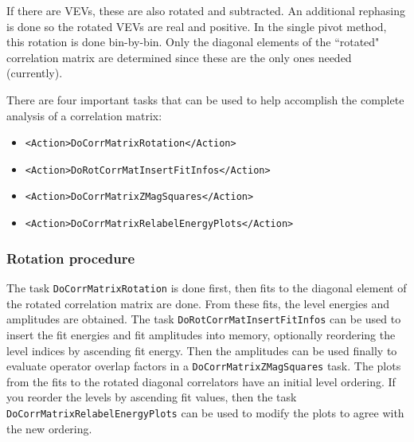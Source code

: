 \documentclass[12pt]{article}
\newcommand{\vb}{\texttt}
\begin{document}
   If there are VEVs, these are also rotated and subtracted.  An                 
   additional rephasing is done so the rotated VEVs are real and positive.       
   In the single pivot method, this rotation is done bin-by-bin.                 
   Only the diagonal elements of the ``rotated" correlation matrix are            
   determined since these are the only ones needed (currently).                  

There are four important tasks that can be used to help accomplish the complete
analysis of a correlation matrix:
\begin{itemize}
\item
\vb{<Action>DoCorrMatrixRotation</Action>}
\item                                              
\vb{<Action>DoRotCorrMatInsertFitInfos</Action>}        
\item                                              
\vb{<Action>DoCorrMatrixZMagSquares</Action>}   
\item                                              
\vb{<Action>DoCorrMatrixRelabelEnergyPlots</Action>}
\end{itemize}

\subsubsection{Rotation procedure}

The task \vb{DoCorrMatrixRotation} is done first, then fits to the diagonal     
element of the rotated correlation matrix are done.  From these fits,        
the level energies and amplitudes are obtained.  The task                    
\vb{DoRotCorrMatInsertFitInfos} can be used to insert the fit energies and  
fit amplitudes into memory, optionally reordering the level indices by       
ascending fit energy.  Then the amplitudes can be used finally to evaluate   
operator overlap factors in a \vb{DoCorrMatrixZMagSquares} task.  The plots     
from the fits to the rotated diagonal correlators have an initial level      
ordering.  If you reorder the levels by ascending fit values, then the       
task \vb{DoCorrMatrixRelabelEnergyPlots} can be used to modify the plots to     
agree with the new ordering.                                                 
                                                                             
\end{document}
